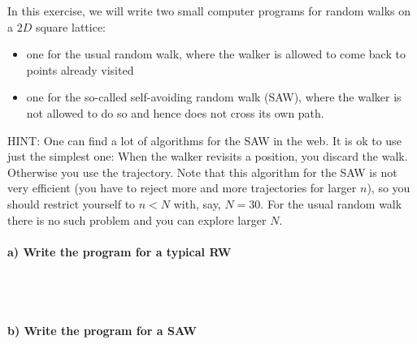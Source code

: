 In this exercise, we will write two small computer programs for random
walks on a $2D$ square lattice:
\begin{itemize}
    \item one for the usual random walk, where the walker is allowed to 
        come back to points already visited
    \item one for the so-called self-avoiding random walk (SAW), 
        where the walker is not allowed to do so and hence does not 
        cross its own path.
\end{itemize}
HINT: One can find a lot of algorithms for the SAW in the web. It is ok 
to use just the simplest one: When the walker revisits a position, you 
discard the walk. Otherwise you use the trajectory. Note that this 
algorithm for the SAW is not very efficient (you have to reject more 
and more trajectories for larger $n$), so you should restrict yourself 
to $n<N$ with, say, $N=30$. For the usual random walk there is no such 
problem and you can explore larger $N$.

\paragraph{a) Write the program for a typical RW} \ \\
\\

\paragraph{b) Write the program for a SAW} \ \\
\\

